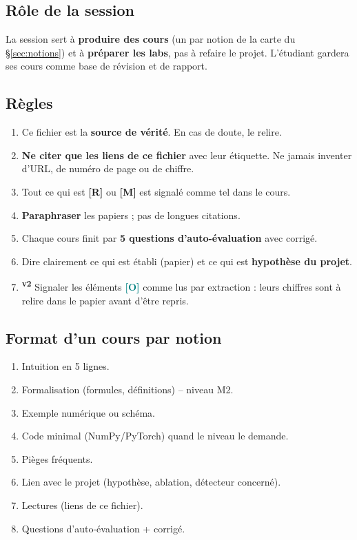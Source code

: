 \documentclass[11pt,a4paper]{article}
\newcommand{\vtwo}{\textsuperscript{\textcolor{orange!80!black}{\textbf{v2}}}}
\newcommand{\lO}{\textbf{\textcolor{teal}{[O]}}}
\newcommand{\lR}{\textbf{\textcolor{orange!80!black}{[R]}}}
\newcommand{\lM}{\textbf{\textcolor{red!70!black}{[M]}}}
\begin{document}
\subsection{Rôle de la session}
La session sert à \textbf{produire des cours} (un par notion de la carte du §\ref{sec:notions}) et à \textbf{préparer les labs}, pas à refaire le projet. L'étudiant gardera ses cours comme base de révision et de rapport.

\subsection{Règles}
\begin{enumerate}
\item Ce fichier est la \textbf{source de vérité}. En cas de doute, le relire.
\item \textbf{Ne citer que les liens de ce fichier} avec leur étiquette. Ne jamais inventer d'URL, de numéro de page ou de chiffre.
\item Tout ce qui est \lR{} ou \lM{} est signalé comme tel dans le cours.
\item \textbf{Paraphraser} les papiers ; pas de longues citations.
\item Chaque cours finit par \textbf{5 questions d'auto-évaluation} avec corrigé.
\item Dire clairement ce qui est établi (papier) et ce qui est \textbf{hypothèse du projet}.
\item \vtwo{} Signaler les éléments \lO{} comme lus par extraction : leurs chiffres sont à relire dans le papier avant d'être repris.
\end{enumerate}

\subsection{Format d'un cours par notion}\label{sec:format}
\begin{enumerate}
\item Intuition en 5 lignes.
\item Formalisation (formules, définitions) -- niveau M2.
\item Exemple numérique ou schéma.
\item Code minimal (NumPy/PyTorch) quand le niveau le demande.
\item Pièges fréquents.
\item Lien avec le projet (hypothèse, ablation, détecteur concerné).
\item Lectures (liens de ce fichier).
\item Questions d'auto-évaluation + corrigé.
\end{enumerate}
\end{document}
